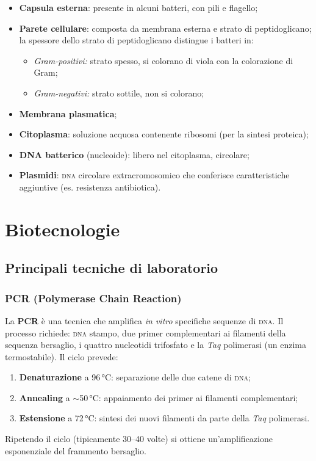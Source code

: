 \documentclass[11pt,a4paper,openright,twoside]{book}
\theoremstyle{definition}
\theoremstyle{plain}
\theoremstyle{remark}
\newcommand{\dna}{\textsc{dna}}
\begin{document}
\begin{itemize}
  \item \textbf{Capsula esterna}: presente in alcuni batteri, con pili e flagello;
  \item \textbf{Parete cellulare}: composta da membrana esterna e strato di peptidoglicano; la spessore dello strato di peptidoglicano distingue i batteri in:
    \begin{itemize}
      \item \textit{Gram-positivi:} strato spesso, si colorano di viola con la colorazione di Gram;
      \item \textit{Gram-negativi:} strato sottile, non si colorano;
    \end{itemize}
  \item \textbf{Membrana plasmatica};
  \item \textbf{Citoplasma}: soluzione acquosa contenente ribosomi (per la sintesi proteica);
  \item \textbf{DNA batterico} (nucleoide): libero nel citoplasma, circolare;
  \item \textbf{Plasmidi}: \dna{} circolare extracromosomico che conferisce caratteristiche aggiuntive (es. resistenza antibiotica).
\end{itemize}

\section{Biotecnologie}

\subsection{Principali tecniche di laboratorio}

\subsubsection{PCR (Polymerase Chain Reaction)}

La \textbf{PCR} è una tecnica che amplifica \textit{in vitro} specifiche sequenze di \dna. Il processo richiede: \dna{} stampo, due primer complementari ai filamenti della sequenza bersaglio, i quattro nucleotidi trifosfato e la \textit{Taq} polimerasi (un enzima termostabile). Il ciclo prevede:
\begin{enumerate}
  \item \textbf{Denaturazione} a 96\,°C: separazione delle due catene di \dna;
  \item \textbf{Annealing} a $\sim$50\,°C: appaiamento dei primer ai filamenti complementari;
  \item \textbf{Estensione} a 72\,°C: sintesi dei nuovi filamenti da parte della \textit{Taq} polimerasi.
\end{enumerate}
Ripetendo il ciclo (tipicamente 30--40 volte) si ottiene un'amplificazione esponenziale del frammento bersaglio.
\end{document}
